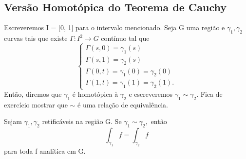 \documentclass[complex.tex]{subfiles}
\begin{document}
\subsection{Versão Homotópica do Teorema de Cauchy}
Escreveremos I = [0, 1] para o intervalo mencionado. Seja G uma região e $\gamma_{1}, \gamma_{2}$ curvas tais que existe
\(\Gamma:I^{2}\rightarrow G\) contínuo tal que
$$
	\left\{\begin{array}{ll}
		\Gamma(s, 0) = \gamma_{1}(s)                 \\
		\Gamma(s, 1) = \gamma_{2}(s)                 \\
		\Gamma(0, t) = \gamma_{1}(0) = \gamma_{2}(0) \\
		\Gamma(1, t) = \gamma_{1}(1) = \gamma_{2}(1).
	\end{array}\right.
$$
Então, diremos que $\gamma_{1}$ é homotópica à $\gamma_{2}$ e escreveremos $\gamma_{1}\sim\gamma_{2}.$ Fica de exercício
mostrar que $\sim$ é uma relação de equivalência.
\begin{theorem*}
	Sejam $\gamma_{1}, \gamma_{2}$ retificáveis na região G. Se $\gamma_{1}\sim \gamma_{2},$ então
	$$
		\int_{\gamma_{1}}f = \int_{\gamma_{2}}f
	$$
	para toda f analítica em G.
\end{theorem*}
\end{document}
